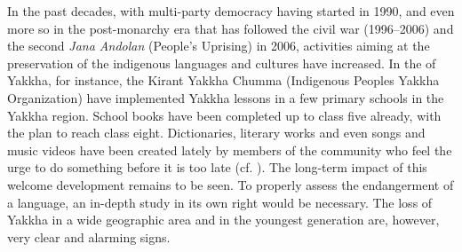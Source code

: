 In the past decades, with multi-party democracy having started in 1990, and even more so in the post-monarchy era that has followed the civil war (1996–2006) and the second \emph{Jana Andolan} (People's Uprising) in 2006, activities aiming at the preservation of the indigenous languages and cultures have increased. In the  of Yakkha, for instance, the Kirant Yakkha Chumma (Indigenous Peoples Yakkha Organization) have implemented Yakkha lessons in a few primary schools in the Yakkha region.  School books have been completed up to class five already, with the plan to reach class eight. Dictionaries, literary works and even songs and music videos have been created lately by members of the community who feel the urge to do something before it is too late (cf. ). The long-term impact of this welcome development remains to be seen. To properly assess the endangerment of a language, an in-depth study in its own right would be necessary. The loss of Yakkha in a wide geographic area and in the youngest generation are, however, very clear and alarming signs.





